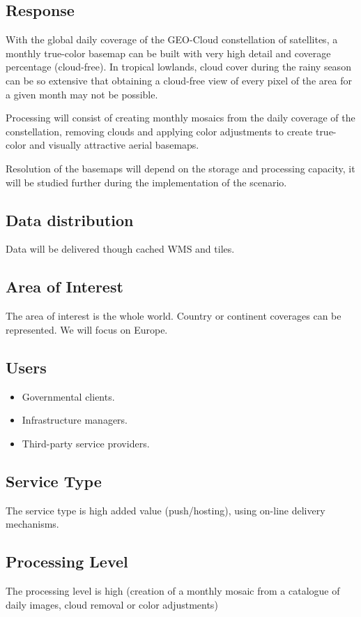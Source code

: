 \subsection{Response}
With the global daily coverage of the GEO-Cloud constellation of satellites, a monthly true-color basemap can be built with very high detail and coverage percentage (cloud-free). In tropical lowlands, cloud cover during the rainy season can be so extensive that obtaining a cloud-free view of every pixel of the area for a given month may not be possible.

Processing will consist of creating monthly mosaics from the daily coverage of the constellation, removing clouds and applying color adjustments to create true-color and visually attractive aerial basemaps.

Resolution of the basemaps will depend on the storage and processing capacity, it will be studied further during the implementation of the scenario.
\subsection{Data distribution}
Data will be delivered though cached \ac{WMS} and tiles.
\subsection{Area of Interest}
The area of interest is the whole world. Country or continent coverages can be represented. We will focus on Europe.
\subsection{Users}
\begin{itemize}
\item Governmental clients.
\item Infrastructure managers.
\item Third-party service providers.
\end{itemize}

\subsection{Service Type}
The service type is high added value (push/hosting), using on-line delivery mechanisms.
\subsection{Processing Level}
The processing level is high (creation of a monthly mosaic from a catalogue of
daily images, cloud removal or color adjustments)
